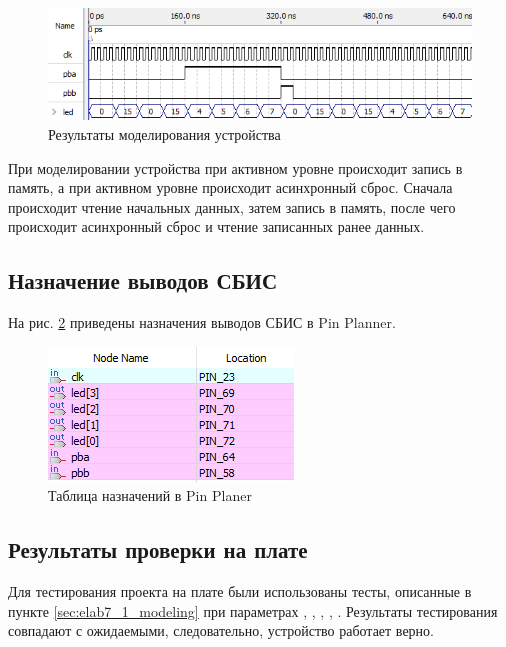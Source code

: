 \begin{figure}[H]
\begin{center}
	\includegraphics[width=\textwidth]{elab7_1_modeling}
	\caption{Результаты моделирования устройства}
	\label{fig:elab7_1_modeling}
\end{center}
\end{figure}

При моделировании устройства при активном уровне  происходит запись в память, а при активном уровне  происходит асинхронный сброс. Сначала происходит чтение начальных данных, затем запись в память, после чего происходит асинхронный сброс и чтение записанных ранее данных.

\subsection{Назначение выводов СБИС}

На рис. \ref{fig:elab7_1_pins} приведены назначения выводов СБИС в Pin Planner.

\begin{figure}[H]
\begin{center}
	\includegraphics{elab7_1_pins}
	\caption{Таблица назначений в Pin Planer}
	\label{fig:elab7_1_pins}
\end{center}
\end{figure}

\subsection{Результаты проверки на плате}

Для тестирования проекта на плате были использованы тесты, описанные в пункте \ref{sec:elab7_1_modeling} при параметрах , , , , . Результаты тестирования совпадают с ожидаемыми, следовательно, устройство работает верно.

